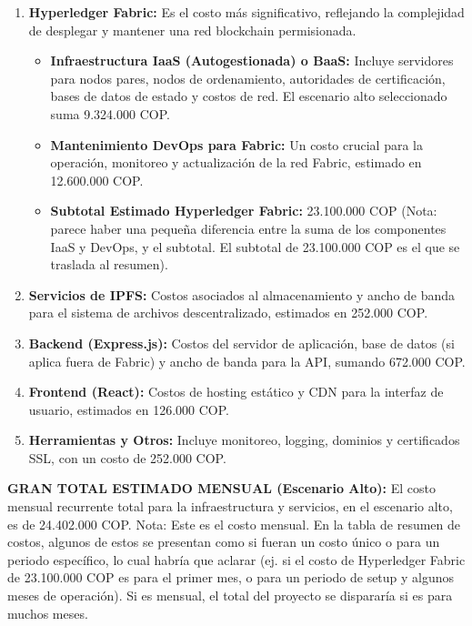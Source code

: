 \begin{enumerate}
\item \textbf{Hyperledger Fabric:} Es el costo más significativo, reflejando la complejidad de desplegar y mantener una red blockchain permisionada. 

\begin{itemize}
\item \textbf{Infraestructura IaaS (Autogestionada) o BaaS:} Incluye servidores para nodos pares, nodos de ordenamiento, autoridades de certificación, bases de datos de estado y costos de red. El escenario alto seleccionado suma 9.324.000 COP. 

\item \textbf{Mantenimiento DevOps para Fabric:} Un costo crucial para la operación, monitoreo y actualización de la red Fabric, estimado en 12.600.000 COP. 

\item\textbf{Subtotal Estimado Hyperledger Fabric:} 23.100.000 COP (Nota: parece haber una pequeña diferencia entre la suma de los componentes IaaS y DevOps, y el subtotal. El subtotal de 23.100.000 COP es el que se traslada al resumen). 
\end{itemize}
\item \textbf{Servicios de IPFS:} Costos asociados al almacenamiento y ancho de banda para el 		sistema de archivos descentralizado, estimados en 252.000 COP. 

\item \textbf{Backend (Express.js):} Costos del servidor de aplicación, base de datos (si aplica fuera de Fabric) y ancho de banda para la API, sumando 672.000 COP. 

\item \textbf{Frontend (React):} Costos de hosting estático y CDN para la interfaz de usuario, estimados en 126.000 COP. 

\item \textbf{Herramientas y Otros:} Incluye monitoreo, logging, dominios y certificados SSL, con un costo de 252.000 COP. 
\end{enumerate}
 

\textbf{GRAN TOTAL ESTIMADO MENSUAL (Escenario Alto):} El costo mensual recurrente total para la infraestructura y servicios, en el escenario alto, es de 24.402.000 COP. Nota: Este es el costo mensual. En la tabla de resumen de costos, algunos de estos se presentan como si fueran un costo único o para un periodo específico, lo cual habría que aclarar (ej. si el costo de Hyperledger Fabric de 23.100.000 COP es para el primer mes, o para un periodo de setup y algunos meses de operación). Si es mensual, el total del proyecto se dispararía si es para muchos meses. 

